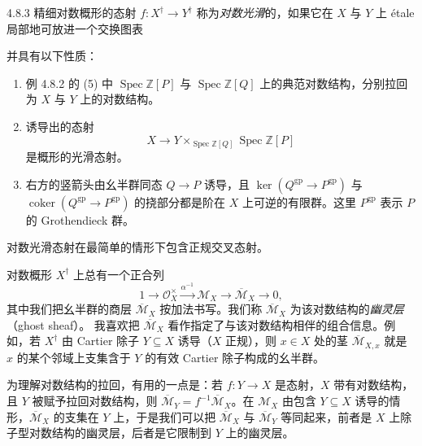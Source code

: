 \begin{definition}{4.8.3}
精细对数概形的态射 $f:X^\dagger\to Y^\dagger$ 称为\emph{对数光滑}的，如果它在 $X$ 与 $Y$ 上 étale 局部地可放进一个交换图表
\begin{center}
\end{center}
并具有以下性质：
\begin{enumerate}
\item 例 4.8.2 的 (5) 中 $\operatorname{Spec}\mathbb{Z}[P]$ 与 $\operatorname{Spec}\mathbb{Z}[Q]$ 上的典范对数结构，分别拉回为 $X$ 与 $Y$ 上的对数结构。
\item 诱导出的态射
\[
X\to Y\times_{\operatorname{Spec}\mathbb{Z}[Q]}\operatorname{Spec}\mathbb{Z}[P]
\]
是概形的光滑态射。
\item 右方的竖箭头由幺半群同态 $Q\to P$ 诱导，且 $\ker(Q^{\mathrm{gp}}\to P^{\mathrm{gp}})$ 与 $\operatorname{coker}(Q^{\mathrm{gp}}\to P^{\mathrm{gp}})$ 的挠部分都是阶在 $X$ 上可逆的有限群。这里 $P^{\mathrm{gp}}$ 表示 $P$ 的 Grothendieck 群。
\end{enumerate}
\end{definition}
对数光滑态射在最简单的情形下包含正规交叉态射。

对数概形 $X^\dagger$ 上总有一个正合列
\[
1\longrightarrow\mathcal{O}_X^\times\xrightarrow{\alpha^{-1}}\mathcal{M}_X\longrightarrow\overline{\mathcal{M}}_X\longrightarrow 0,
\]
其中我们把幺半群的商层 $\overline{\mathcal{M}}_X$ 按加法书写。我们称 $\overline{\mathcal{M}}_X$ 为该对数结构的\emph{幽灵层}（ghost sheaf）。
我喜欢把 $\overline{\mathcal{M}}_X$ 看作指定了与该对数结构相伴的组合信息。例如，若 $X^\dagger$ 由 Cartier 除子 $Y\subseteq X$ 诱导（$X$ 正规），则 $x\in X$ 处的茎 $\overline{\mathcal{M}}_{X,x}$ 就是 $x$ 的某个邻域上支集含于 $Y$ 的有效 Cartier 除子构成的幺半群。

为理解对数结构的拉回，有用的一点是：若 $f:Y\to X$ 是态射，$X$ 带有对数结构，且 $Y$ 被赋予拉回对数结构，则 $\overline{\mathcal{M}}_Y=f^{-1}\overline{\mathcal{M}}_X$。在 $\mathcal{M}_X$ 由包含 $Y\subseteq X$ 诱导的情形，$\overline{\mathcal{M}}_X$ 的支集在 $Y$ 上，于是我们可以把 $\overline{\mathcal{M}}_X$ 与 $\overline{\mathcal{M}}_Y$ 等同起来，前者是 $X$ 上除子型对数结构的幽灵层，后者是它限制到 $Y$ 上的幽灵层。

